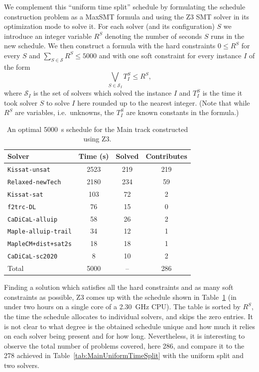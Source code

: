 \documentclass{elsarticle}
\newcommand{\solver}[1]{\texttt{#1}}
\begin{document}
We complement this ``uniform time split'' schedule by formulating the schedule construction problem as a MaxSMT formula and using the Z3 SMT solver \cite{DBLP:conf/tacas/MouraB08} in its optimization mode \cite{DBLP:conf/sycss/BjornerP14} to solve it.
For each solver (and its configuration) $S$ we introduce an integer variable $R^S$ denoting the number of seconds $S$ runs in the new schedule. 
We then construct a formula with the hard constraints $0 \leq R^S$ for every $S$ and $\sum_{S\in\mathcal{S}} R^S \leq 5000$ and with one soft constraint for every instance $I$ of the form \[\bigvee_{S \in \mathcal{S}_I} T^S_I \leq R^S,\]
where $\mathcal{S}_I$ is the set of solvers which solved the instance $I$ and $T^S_I$ is the time it took solver $S$ to solve $I$ here rounded up to the nearest integer.
(Note that while $R^S$ are variables, i.e.~unknowns, the $T^S_I$ are known constants in the formula.)

\begin{table}
\centering\small
\begin{tabularx}{\linewidth}{Xccc}
\bf Solver & \bf Time (s) & \bf Solved & \bf Contributes \\
\hline\arrayrulecolor{lightgray}
\solver{Kissat-unsat} & 2523 & 219 & 219 \\
\solver{Relaxed-newTech} & 2180 & 234 & \phantom{0}59 \\
\solver{Kissat-sat} & \phantom{0}103 & \phantom{0}72 & \phantom{00}2 \\
\solver{f2trc-DL} & \phantom{00}76 & \phantom{0}15 & \phantom{00}0 \\
\solver{CaDiCaL-alluip} & \phantom{00}58 & \phantom{0}26 & \phantom{00}2 \\
\solver{Maple-alluip-trail} & \phantom{00}34 & \phantom{0}12 & \phantom{00}1 \\
\solver{MapleCM+dist+sat2s} & \phantom{00}18 & \phantom{0}18 & \phantom{00}1 \\
\solver{CaDiCaL-sc2020} & \phantom{000}8 & \phantom{0}10 & \phantom{00}2 \\
\hline 
Total & 5000 & \phantom{0}-- & 286 \\ 
\end{tabularx}
\caption{An optimal \SI{5000}{\second} schedule for the Main track
constructed using Z3.}
\label{tab:MainZ3Schedule}
\end{table}

Finding a solution which satisfies all the hard constraints and as many soft constraints as possible,
Z3 comes up with the schedule shown in Table~\ref{tab:MainZ3Schedule} (in under two hours on a single core of a \SI{2.30}{\giga\hertz} CPU).
The table is sorted by $R^S$, the time the schedule allocates to individual solvers, and skips the zero entries.
It is not clear to what degree is the obtained schedule unique and how much it relies on each solver being present and for how long.
Nevertheless, it is interesting to observe the total number of problems covered, here 286,
and compare it to the 278 achieved in Table~\ref{tab:MainUniformTimeSplit} with the uniform split and two solvers.
\end{document}
